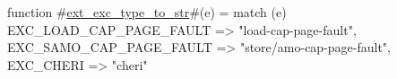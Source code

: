 function #\hyperref[sailRISCVzextzyexczytypezytozystr]{ext\_exc\_type\_to\_str}#(e) =
  match (e) {
    EXC_LOAD_CAP_PAGE_FAULT => "load-cap-page-fault",
    EXC_SAMO_CAP_PAGE_FAULT => "store/amo-cap-page-fault",
    EXC_CHERI               => "cheri"
  }
